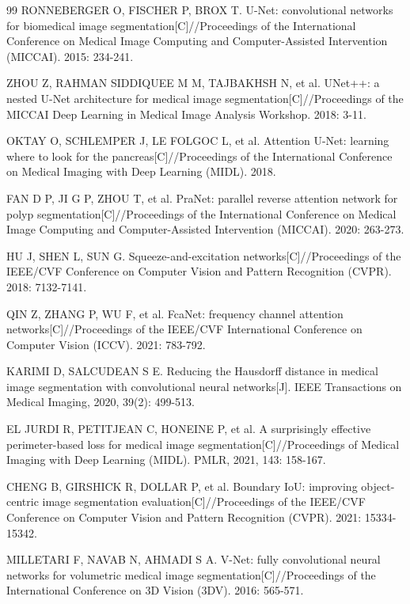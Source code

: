 \documentclass[conference]{IEEEtran}
\begin{document}
\begin{thebibliography}{99}
RONNEBERGER O, FISCHER P, BROX T. U-Net: convolutional networks for biomedical image segmentation[C]//Proceedings of the International Conference on Medical Image Computing and Computer-Assisted Intervention (MICCAI). 2015: 234-241.

ZHOU Z, RAHMAN SIDDIQUEE M M, TAJBAKHSH N, et al. UNet++: a nested U-Net architecture for medical image segmentation[C]//Proceedings of the MICCAI Deep Learning in Medical Image Analysis Workshop. 2018: 3-11.

OKTAY O, SCHLEMPER J, LE FOLGOC L, et al. Attention U-Net: learning where to look for the pancreas[C]//Proceedings of the International Conference on Medical Imaging with Deep Learning (MIDL). 2018.

FAN D P, JI G P, ZHOU T, et al. PraNet: parallel reverse attention network for polyp segmentation[C]//Proceedings of the International Conference on Medical Image Computing and Computer-Assisted Intervention (MICCAI). 2020: 263-273.

HU J, SHEN L, SUN G. Squeeze-and-excitation networks[C]//Proceedings of the IEEE/CVF Conference on Computer Vision and Pattern Recognition (CVPR). 2018: 7132-7141.

QIN Z, ZHANG P, WU F, et al. FcaNet: frequency channel attention networks[C]//Proceedings of the IEEE/CVF International Conference on Computer Vision (ICCV). 2021: 783-792.

KARIMI D, SALCUDEAN S E. Reducing the Hausdorff distance in medical image segmentation with convolutional neural networks[J]. IEEE Transactions on Medical Imaging, 2020, 39(2): 499-513.

EL JURDI R, PETITJEAN C, HONEINE P, et al. A surprisingly effective perimeter-based loss for medical image segmentation[C]//Proceedings of Medical Imaging with Deep Learning (MIDL). PMLR, 2021, 143: 158-167.

CHENG B, GIRSHICK R, DOLLAR P, et al. Boundary IoU: improving object-centric image segmentation evaluation[C]//Proceedings of the IEEE/CVF Conference on Computer Vision and Pattern Recognition (CVPR). 2021: 15334-15342.

MILLETARI F, NAVAB N, AHMADI S A. V-Net: fully convolutional neural networks for volumetric medical image segmentation[C]//Proceedings of the International Conference on 3D Vision (3DV). 2016: 565-571.


\end{thebibliography}
\end{document}

